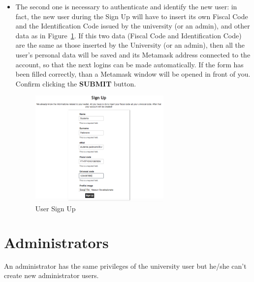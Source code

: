 \begin{itemize}
	\item The second one is necessary to authenticate and identify the new user: in fact, the  new user during the Sign Up will have to insert its own Fiscal Code and the Identification Code issued by the university (or an admin), and other data as in Figure~\ref{fig:stdSignUp}. If this two data (Fiscal Code and Identification Code) are the same as those inserted by the University (or an admin), then all the user's personal data will be saved and its Metamask address connected to the account, so that the next logins can be made automatically.
	If the form has been filled correctly, than a Metamask window will be opened in front of you. Confirm clicking the \textbf{SUBMIT} button.
	\begin{figure}[H]
		\centering
		\includegraphics[width=0.65\textwidth]{img/stdSignUp.png}
		\caption{User Sign Up}
		\label{fig:stdSignUp}
	\end{figure}
\end{itemize}

\newpage
\section{Administrators}
An administrator has the same privileges of the university user but he/she can't create new administrator users.






